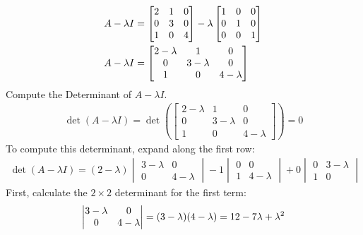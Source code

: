 \begin{align}
    A - \lambda I &= \begin{bmatrix}
    2 & 1 & 0 \\
    0 & 3 & 0 \\
    1 & 0 & 4
    \end{bmatrix} - \lambda \begin{bmatrix}
    1 & 0 & 0 \\
    0 & 1 & 0 \\
    0 & 0 & 1
    \end{bmatrix}\notag\\
    A - \lambda I &= \begin{bmatrix}
    2 - \lambda & 1 & 0 \\
    0 & 3 - \lambda & 0 \\
    1 & 0 & 4 - \lambda
    \end{bmatrix}
\end{align}
Compute the Determinant of $A - \lambda I$.
\begin{align}
    \det(A - \lambda I) = \det\left(\begin{bmatrix}
    2 - \lambda & 1 & 0 \\
    0 & 3 - \lambda & 0 \\
    1 & 0 & 4 - \lambda
    \end{bmatrix}\right) = 0
\end{align}
To compute this determinant, expand along the first row:
\begin{align}
    \det(A - \lambda I) = (2 - \lambda) \begin{vmatrix}
    3 - \lambda & 0 \\
    0 & 4 - \lambda
    \end{vmatrix} - 1 \begin{vmatrix}
    0 & 0 \\
    1 & 4 - \lambda
    \end{vmatrix} + 0 \begin{vmatrix}
    0 & 3 - \lambda \\
    1 & 0
    \end{vmatrix}\label{eq:det-first-step}
\end{align}
First, calculate the $2 \times 2$ determinant for the first term:
\begin{align}
    \begin{vmatrix}
    3 - \lambda & 0 \\
    0 & 4 - \lambda
    \end{vmatrix} = (3 - \lambda)(4 - \lambda) = 12 - 7\lambda + \lambda^2\notag
\end{align}
